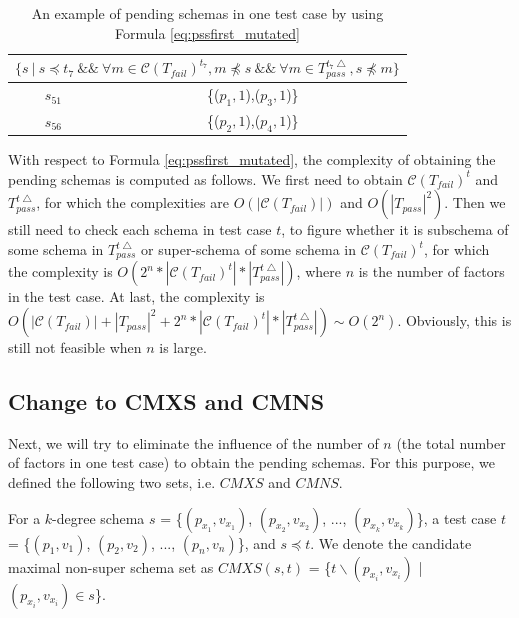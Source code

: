 \begin{table}[htbp]
  \centering
  \caption{An example of pending schemas in one test case by using Formula \ref{eq:pssfirst_mutated} }
  \label{ex:pendingschemasinonetestcaseusingfaultyandhealthy}
    \begin{tabular}{|c|c|} \hline
     \multicolumn{2}{|c|}{$\{ s\ |\ s \preceq t_{7}\ \&\&\ \forall m \in \mathcal{C}(T_{fail})^{t_{7}},  m \npreceq s  \ \&\&\  \forall m \in T_{pass}^{t_{7}\bigtriangleup}, s \npreceq m \} $} \\ \hline
   $s_{51}$ & \{($p_{1}, 1$),($p_{3}, 1$)\} \\
   $s_{56}$ & \{($p_{2}, 1$),($p_{4}, 1$)\} \\ \hline
    \end{tabular}%
\end{table}


With respect to Formula \ref{eq:pssfirst_mutated}, the complexity of obtaining the pending schemas is computed as follows. We first need to obtain $\mathcal{C}(T_{fail})^{t}$ and $T_{pass}^{t\bigtriangleup}$, for which the complexities are $O(|\mathcal{C}(T_{fail})|)$ and $O(|T_{pass}|^{2})$. Then we still need to check each schema in test case $t$, to figure whether it is subschema of some schema in $T_{pass}^{t\bigtriangleup}$ or super-schema of some schema in $\mathcal{C}(T_{fail})^{t}$, for which the complexity is $O(2^{n}* |\mathcal{C}(T_{fail})^{t}| * |T_{pass}^{t\bigtriangleup}|)$, where $n$ is the number of factors in the test case.  At last, the complexity is $O(|\mathcal{C}(T_{fail})| + |T_{pass}|^{2} + 2^{n}* |\mathcal{C}(T_{fail})^{t}| * |T_{pass}^{t\bigtriangleup}| ) \sim O(2^{n})$. Obviously, this is still not feasible when $n$ is large.



\subsection{Change to CMXS and CMNS}

Next, we will try to eliminate the influence of the number of $n$ (the total number of factors in one test case) to obtain the pending schemas. For this purpose, we defined the following two sets, i.e. $CMXS$ and $CMNS$.

\begin{definition}
For a $k$-degree schema $s$ = \{$(p_{x_{1}}, v_{x_{1}})$, $(p_{x_{2}}, v_{x_{2}})$, ..., $(p_{x_{k}}, v_{x_{k}})$\}, a test case $t$ = \{$(p_{1}, v_{1})$, $(p_{2}, v_{2})$, ..., $(p_{n}, v_{n})$\}, and $s \preceq t$. We denote the candidate maximal non-super schema set as $CMXS(s,t)$ = \{$t \backslash (p_{x_{i}}, v_{x_{i}})$ | $(p_{x_{i}}, v_{x_{i}}) \in s $\}.
\end{definition}

